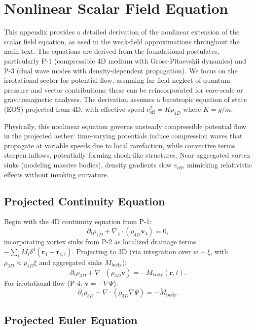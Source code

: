 \appendix
\section{Nonlinear Scalar Field Equation}

This appendix provides a detailed derivation of the nonlinear extension of the scalar field equation, as used in the weak-field approximations throughout the main text. The equations are derived from the foundational postulates, particularly P-1 (compressible 4D medium with Gross-Pitaevskii dynamics) and P-3 (dual wave modes with density-dependent propagation). We focus on the irrotational sector for potential flow, assuming far-field neglect of quantum pressure and vector contributions; these can be reincorporated for core-scale or gravitomagnetic analyses. The derivation assumes a barotropic equation of state (EOS) projected from 4D, with effective speed $v_{\text{eff}}^2 = K \rho_{4D}$ where $K = g/m$.

Physically, this nonlinear equation governs unsteady compressible potential flow in the projected aether: time-varying potentials induce compression waves that propagate at variable speeds due to local rarefaction, while convective terms steepen inflows, potentially forming shock-like structures. Near aggregated vortex sinks (modeling massive bodies), density gradients slow $v_{\text{eff}}$, mimicking relativistic effects without invoking curvature.

\subsection{Projected Continuity Equation}

Begin with the 4D continuity equation from P-1:
\[
\partial_t \rho_{4D} + \nabla_4 \cdot (\rho_{4D} \mathbf{v}_4) = 0,
\]
incorporating vortex sinks from P-2 as localized drainage terms $-\sum_i \dot{M}_i \delta^4(\mathbf{r}_4 - \mathbf{r}_{4,i})$. Projecting to 3D (via integration over $w \sim \xi$, with $\rho_{3D} \approx \rho_{4D} \xi$ and aggregated sinks $\dot{M}_{\text{body}}$):
\[
\partial_t \rho_{3D} + \nabla \cdot (\rho_{3D} \mathbf{v}) = -\dot{M}_{\text{body}}(\mathbf{r}, t).
\]
For irrotational flow (P-4: $\mathbf{v} = -\nabla \Psi$):
\[
\partial_t \rho_{3D} - \nabla \cdot (\rho_{3D} \nabla \Psi) = -\dot{M}_{\text{body}}.
\]

\subsection{Projected Euler Equation}

